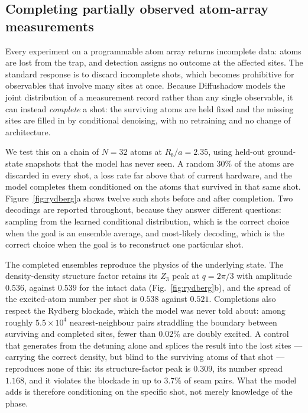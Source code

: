 %


\subsection{Completing partially observed atom-array measurements}

Every experiment on a programmable atom array returns incomplete data: atoms
are lost from the trap, and detection assigns no outcome at the affected
sites. The standard response is to discard incomplete shots, which becomes
prohibitive for observables that involve many sites at once. Because
Diffushadow models the joint distribution of a measurement record rather than
any single observable, it can instead \emph{complete} a shot: the surviving
atoms are held fixed and the missing sites are filled in by conditional
denoising, with no retraining and no change of architecture.

We test this on a chain of $N=32$ atoms at $R_b/a = 2.35$, using held-out
ground-state snapshots that the model has never seen. A random $30\%$ of the
atoms are discarded in every shot, a loss rate far above that of current
hardware, and the model completes them conditioned on the atoms that survived
in that same shot. Figure~\ref{fig:rydberg}a shows twelve such shots before
and after completion. Two decodings are reported throughout, because they
answer different questions: sampling from the learned conditional
distribution, which is the correct choice when the goal is an ensemble
average, and most-likely decoding, which is the correct choice when the goal
is to reconstruct one particular shot.

The completed ensembles reproduce the physics of the underlying state. The
density-density structure factor retains its $Z_3$ peak at $q = 2\pi/3$ with
amplitude $0.536$, against $0.539$ for the intact data
(Fig.~\ref{fig:rydberg}b), and the spread of the excited-atom number per shot
is $0.538$ against $0.521$. Completions also respect the Rydberg blockade,
which the model was never told about: among roughly $5.5\times10^4$
nearest-neighbour pairs straddling the boundary between surviving and
completed sites, fewer than $0.02\%$ are doubly excited. A control that
generates from the detuning alone and splices the result into the lost sites
--- carrying the correct density, but blind to the surviving atoms of that
shot --- reproduces none of this: its structure-factor peak is $0.309$, its
number spread $1.168$, and it violates the blockade in up to $3.7\%$ of seam
pairs. What the model adds is therefore conditioning on the specific shot,
not merely knowledge of the phase.

